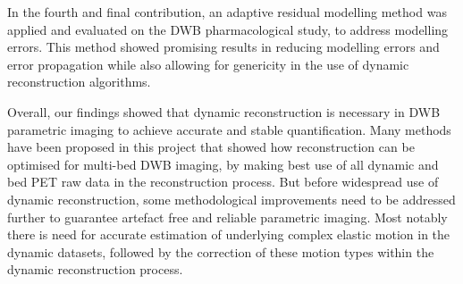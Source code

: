 In the fourth and final contribution, an adaptive residual modelling method was applied and evaluated on the DWB pharmacological study, to address modelling errors. This method showed promising results in reducing modelling errors and error propagation while also allowing for genericity in the use of dynamic reconstruction algorithms.

Overall, our findings showed that dynamic reconstruction is necessary in DWB parametric imaging to achieve accurate and stable quantification. Many methods have been proposed in this project that showed how reconstruction can be optimised for multi-bed DWB imaging, by making best use of all dynamic and bed PET raw data in the reconstruction process. But before widespread use of dynamic reconstruction, some methodological improvements need to be addressed further to guarantee artefact free and reliable parametric imaging. Most notably there is need for accurate estimation of underlying complex elastic motion in the dynamic datasets, followed by the correction of these motion types within the dynamic reconstruction process.

